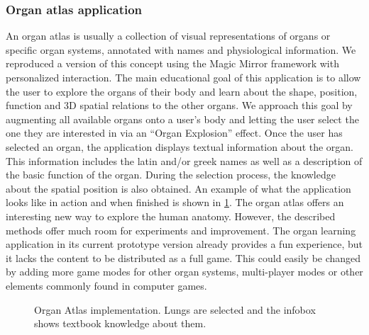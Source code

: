 \subsubsection{Organ atlas application}
An organ atlas is usually a collection of visual representations of organs or specific organ systems, annotated with names and physiological information.
We reproduced a version of this concept using the Magic Mirror framework with personalized interaction. The main educational goal of this application is to allow the user to explore the organs of their body and learn about the shape, position, function and 3D spatial relations to the other organs.
We approach this goal by augmenting all available organs onto a user's body and letting the user select the one they are interested in via an ``Organ Explosion'' effect. Once the user has selected an organ, the application displays textual information about the organ. This information includes the latin and/or greek names as well as a description of the basic function of the organ. During the selection process, the knowledge about the spatial position is also obtained. An example of what the application looks like in action and when finished is shown in \figurename{\ref{fig:3-IMR:OrganAtlas}}. The organ atlas offers an interesting new way to explore the human anatomy. However, the described methods offer much room for experiments and improvement. The organ learning application in its current prototype version already provides a fun experience, but it lacks the content to be distributed as a full game. This could easily be changed by adding more game modes for other organ systems, multi-player modes or other elements commonly found in computer games.
\begin{figure}
\centering
{}
\caption{Organ Atlas implementation. Lungs are selected and the infobox shows textbook knowledge about them.}
\label{fig:3-IMR:OrganAtlas}
\end{figure}
